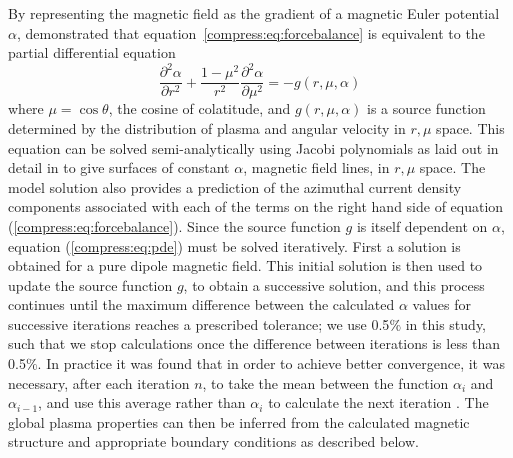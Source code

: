 By representing the magnetic field as the gradient of a magnetic Euler potential $\alpha$, \citet{caudal1986} demonstrated that equation~\ref{compress:eq:forcebalance} is equivalent to the partial differential equation
\begin{equation}\label{compress:eq:pde}
\frac{\partial^2\alpha}{\partial r^2} + \frac{1-\mu^2}{r^2} \frac{\partial^2\alpha}{\partial \mu^2} = -g(r,\mu,\alpha)
\end{equation}
where $\mu = \cos\theta$, the cosine of colatitude, and $g(r,\mu,\alpha)$ is a source function determined by the distribution of plasma and angular velocity in $r,\mu$ space. This equation can be solved semi-analytically using Jacobi polynomials as laid out in detail in \citet[Appendix]{achilleos2010a} to give surfaces of constant $\alpha$, magnetic field lines, in $r, \mu$ space. The model solution also provides a prediction of the azimuthal current density components associated with each of the terms on the right hand side of equation (\ref{compress:eq:forcebalance}). Since the source function $g$ is itself dependent on $\alpha$, equation (\ref{compress:eq:pde}) must be solved iteratively. First a solution is obtained for a pure dipole magnetic field. This initial solution is then used to update the source function $g$, to obtain a successive solution, and this process continues until the maximum difference between the calculated $\alpha$ values for successive iterations reaches a prescribed tolerance; we use 0.5$\%$ in this study, such that we stop calculations once the difference between iterations is less than 0.5$\%$. In practice it was found that in order to achieve better convergence, it was necessary, after each iteration $n$, to take the mean between the function $\alpha_i$ and $\alpha_{i-1}$, and use this average rather than $\alpha_i$ to calculate the next iteration \cite[see][]{caudal1986}. The global plasma properties can then be inferred from the calculated magnetic structure and appropriate boundary conditions as described below.

